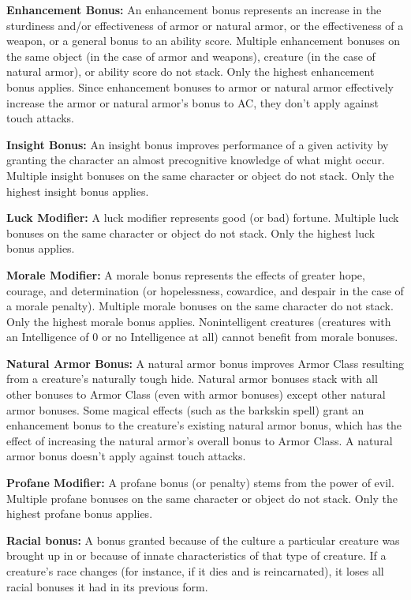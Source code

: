 \textbf{Enhancement Bonus:} An enhancement bonus represents an increase in the sturdiness and/or effectiveness of armor or natural armor, or the effectiveness of a weapon, or a general bonus to an ability score. Multiple enhancement bonuses on the same object (in the case of armor and weapons), creature (in the case of natural armor), or ability score do not stack. Only the highest enhancement bonus applies. Since enhancement bonuses to armor or natural armor effectively increase the armor or natural armor's bonus to AC, they don't apply against touch attacks.

\textbf{Insight Bonus:} An insight bonus improves performance of a given activity by granting the character an almost precognitive knowledge of what might occur. Multiple insight bonuses on the same character or object do not stack. Only the highest insight bonus applies.

\textbf{Luck Modifier:} A luck modifier represents good (or bad) fortune. Multiple luck bonuses on the same character or object do not stack. Only the highest luck bonus applies.

\textbf{Morale Modifier:} A morale bonus represents the effects of greater hope, courage, and determination (or hopelessness, cowardice, and despair in the case of a morale penalty). Multiple morale bonuses on the same character do not stack. Only the highest morale bonus applies. Nonintelligent creatures (creatures with an Intelligence of 0 or no Intelligence at all) cannot benefit from morale bonuses.

\textbf{Natural Armor Bonus:} A natural armor bonus improves Armor Class resulting from a creature's naturally tough hide. Natural armor bonuses stack with all other bonuses to Armor Class (even with armor bonuses) except other natural armor bonuses. Some magical effects (such as the barkskin spell) grant an enhancement bonus to the creature's existing natural armor bonus, which has the effect of increasing the natural armor's overall bonus to Armor Class. A natural armor bonus doesn't apply against touch attacks.

\textbf{Profane Modifier:} A profane bonus (or penalty) stems from the power of evil. Multiple profane bonuses on the same character or object do not stack. Only the highest profane bonus applies.

\textbf{Racial bonus:} A bonus granted because of the culture a particular creature was brought up in or because of innate characteristics of that type of creature. If a creature's race changes (for instance, if it dies and is reincarnated), it loses all racial bonuses it had in its previous form.

